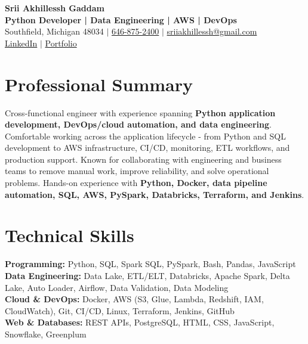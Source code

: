 \documentclass[letterpaper,10pt]{article}
\begin{document}
\fontsize{9.35pt}{10.45pt}\selectfont

\begin{center}
    {\LARGE \textbf{Srii Akhillessh Gaddam}} \\[-1pt]
    \textbf{Python Developer | Data Engineering | AWS | DevOps} \\[2pt]
    Southfield, Michigan 48034 $|$
    \href{tel:6468752400}{646-875-2400} $|$
    \href{mailto:sriiakhillessh@gmail.com}{sriiakhillessh@gmail.com} \\[1pt]
    \href{https://www.linkedin.com/in/srii-akhiilessh-gaddam-b48668191/}{LinkedIn} $|$
    \href{https://sriiakhillesshg.github.io/portfolio/}{Portfolio}
\end{center}
\vspace{-8pt}

\section{Professional Summary}
\small{Cross-functional engineer with experience spanning \textbf{Python application development, DevOps/cloud automation, and data engineering}. Comfortable working across the application lifecycle - from Python and SQL development to AWS infrastructure, CI/CD, monitoring, ETL workflows, and production support. Known for collaborating with engineering and business teams to remove manual work, improve reliability, and solve operational problems. Hands-on experience with \textbf{Python, Docker, data pipeline automation, SQL, AWS, PySpark, Databricks, Terraform, and Jenkins}.}

\section{Technical Skills}
\small{
\textbf{Programming:} Python, SQL, Spark SQL, PySpark, Bash, Pandas, JavaScript \\
\textbf{Data Engineering:} Data Lake, ETL/ELT, Databricks, Apache Spark, Delta Lake, Auto Loader, Airflow, Data Validation, Data Modeling \\
\textbf{Cloud \& DevOps:} Docker, AWS (S3, Glue, Lambda, Redshift, IAM, CloudWatch), Git, CI/CD, Linux, Terraform, Jenkins, GitHub \\
\textbf{Web \& Databases:} REST APIs, PostgreSQL, HTML, CSS, JavaScript, Snowflake, Greenplum
}
\end{document}
